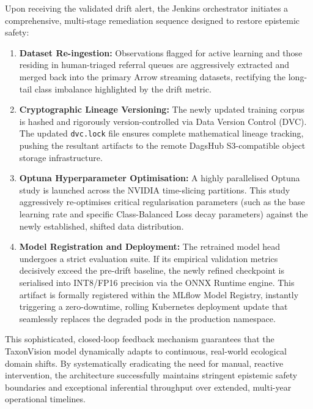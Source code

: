 Upon receiving the validated drift alert, the Jenkins orchestrator initiates a comprehensive, multi-stage remediation sequence designed to restore epistemic safety:
\begin{enumerate}
    \item \textbf{Dataset Re-ingestion:} Observations flagged for active learning and those residing in human-triaged referral queues are aggressively extracted and merged back into the primary Arrow streaming datasets, rectifying the long-tail class imbalance highlighted by the drift metric.
    \item \textbf{Cryptographic Lineage Versioning:} The newly updated training corpus is hashed and rigorously version-controlled via Data Version Control (DVC). The updated \texttt{dvc.lock} file ensures complete mathematical lineage tracking, pushing the resultant artifacts to the remote DagsHub S3-compatible object storage infrastructure.
    \item \textbf{Optuna Hyperparameter Optimisation:} A highly parallelised Optuna study is launched across the NVIDIA time-slicing partitions. This study aggressively re-optimises critical regularisation parameters (such as the base learning rate and specific Class-Balanced Loss decay parameters) against the newly established, shifted data distribution.
    \item \textbf{Model Registration and Deployment:} The retrained model head undergoes a strict evaluation suite. If its empirical validation metrics decisively exceed the pre-drift baseline, the newly refined checkpoint is serialised into INT8/FP16 precision via the ONNX Runtime engine. This artifact is formally registered within the MLflow Model Registry, instantly triggering a zero-downtime, rolling Kubernetes deployment update that seamlessly replaces the degraded pods in the production namespace.
\end{enumerate}



This sophisticated, closed-loop feedback mechanism guarantees that the TaxonVision model dynamically adapts to continuous, real-world ecological domain shifts. By systematically eradicating the need for manual, reactive intervention, the architecture successfully maintains stringent epistemic safety boundaries and exceptional inferential throughput over extended, multi-year operational timelines.
